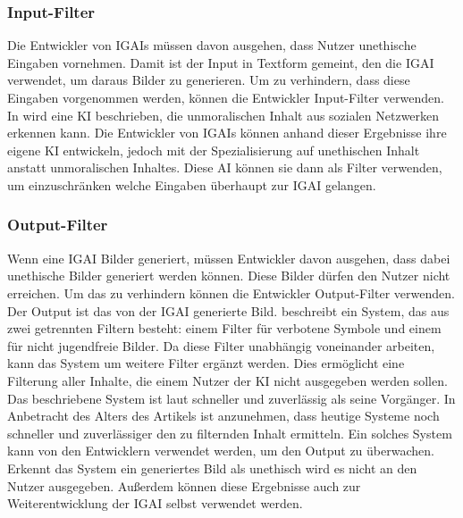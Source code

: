 \documentclass[12pt]{report}
\begin{document}
\subsubsection{Input-Filter}
Die Entwickler von \ac{IGAI}s müssen davon ausgehen, dass Nutzer unethische Eingaben vornehmen. Damit ist der Input in Textform gemeint, den die \ac{IGAI} verwendet, um daraus Bilder zu generieren. Um zu verhindern, dass diese Eingaben vorgenommen werden, können die Entwickler Input-Filter verwenden. In \cite[Artificial Intelligence as a Service for Immoral ContentDetection and Eradication]{Shah} wird eine \ac{KI} beschrieben, die unmoralischen Inhalt aus sozialen Netzwerken erkennen kann. Die Entwickler von \ac{IGAI}s können anhand dieser Ergebnisse ihre eigene \ac{KI} entwickeln, jedoch mit der Spezialisierung auf unethischen Inhalt anstatt unmoralischen Inhaltes. Diese \ac{AI} können sie dann als Filter verwenden, um einzuschränken welche Eingaben überhaupt zur \ac{IGAI} gelangen.

\subsubsection{Output-Filter}
Wenn eine \ac{IGAI} Bilder generiert, müssen Entwickler davon ausgehen, dass dabei unethische Bilder generiert werden können. Diese Bilder dürfen den Nutzer nicht erreichen. Um das zu verhindern können die Entwickler Output-Filter verwenden. Der Output ist das von der \ac{IGAI} generierte Bild. \cite{Zheng} beschreibt ein System, das aus zwei getrennten Filtern besteht: einem Filter für verbotene Symbole und einem für nicht jugendfreie Bilder. Da diese Filter unabhängig voneinander arbeiten, kann das System um weitere Filter ergänzt werden. Dies ermöglicht eine Filterung aller Inhalte, die einem Nutzer der \ac{KI} nicht ausgegeben werden sollen. Das beschriebene System ist laut \cite{Zheng} schneller und zuverlässig als seine Vorgänger. In Anbetracht des Alters des Artikels ist anzunehmen, dass heutige Systeme noch schneller und zuverlässiger den zu filternden Inhalt ermitteln. Ein solches System kann von den Entwicklern verwendet werden, um den Output zu überwachen. Erkennt das System ein generiertes Bild als unethisch wird es nicht an den Nutzer ausgegeben. Außerdem können diese Ergebnisse auch zur Weiterentwicklung der \ac{IGAI} selbst verwendet werden.
\end{document}

